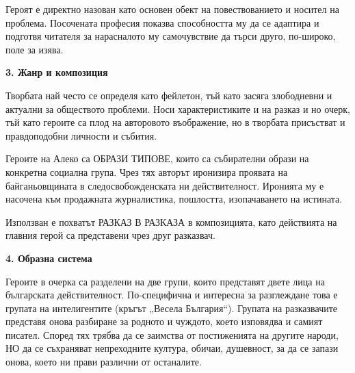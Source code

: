 \documentclass[12pt,a4paper]{article}
\begin{document}
\indent Героят е директно назован като основен обект на повествованието и носител на проблема. Посочената професия показва способността му да се адаптира и подготвя читателя за нарасналото му самочувствие да търси друго, по-широко, поле за изява.
\vspace{0.1cm}
 
\textbf{3. Жанр и композиция}
\vspace{0.1cm}
  
\indent Творбата най често се определя като фейлетон, тъй като засяга злободневни и актуални за обществото проблеми. Носи характеристиките и на разказ и но очерк, тъй като героите са плод на авторовото въображение, но в творбата присъстват и правдоподобни личности и събития.
\vspace{0.1cm}
  
\indent Героите на Алеко са ОБРАЗИ ТИПОВЕ, които са събирателни образи на конкретна социална група. Чрез тях авторът иронизира проявата на байганьовщината в следосвобожденската ни действителност. Иронията му е насочена към продажната журналистика, пошлостта, изопачаването на истината.
\vspace{0.1cm}
  
\indent Използван е похватът РАЗКАЗ В РАЗКАЗА в композицията, като действията на главния герой са представени чрез друг разказвач.
\vspace{0.1cm}
 
\textbf{4. Образна система}
\vspace{0.1cm}
  
\indent Героите в очерка са разделени на две групи, които представят двете лица на българската действителност. По-специфична и интересна за разглеждане това е групата на интелигентите (кръгът „Весела България“). Групата на разказвачите представя онова разбиране за родното и чуждото, което изповядва и самият писател. Според тях трябва да се заимства от постиженията на другите народи, НО да се съхраняват непреходните култура, обичаи, душевност, за да се запази онова, което ни прави различни от останалите.
\vspace{-0.2cm}
  
\end{document}
